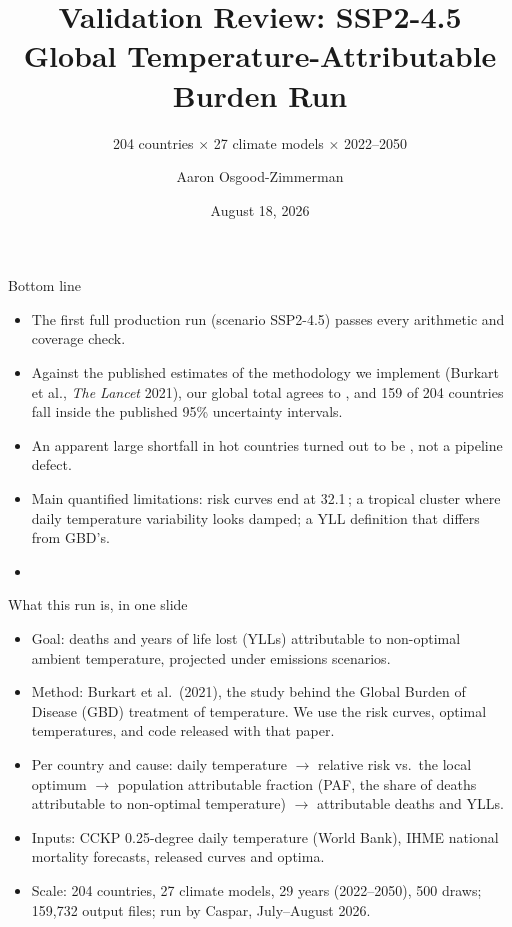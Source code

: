 \documentclass[aspectratio=169,11pt]{beamer}
\title{Validation Review: SSP2-4.5 Global Temperature-Attributable Burden Run}
\subtitle{204 countries \(\times\) 27 climate models \(\times\) 2022--2050}
\author{Aaron Osgood-Zimmerman}
\institute{OZ Labs LLC, for the World Bank climate-health project}
\date{August 18, 2026}
\begin{document}
\begin{frame}
  \titlepage
\end{frame}

\begin{frame}{Bottom line}
  \begin{itemize}
    \item The first full production run (scenario SSP2-4.5) passes every
      arithmetic and coverage check.
    \item Against the published estimates of the methodology we implement
      (Burkart et al., \textit{The Lancet} 2021), our global total agrees to
      , and 159 of 204 countries fall inside the published
      95\% uncertainty intervals.
    \item An apparent large shortfall in hot countries turned out to be
      , not a pipeline
      defect.
    \item Main quantified limitations: risk curves end at
      32.1\,\textcelsius{}; a tropical cluster where daily temperature
      variability looks damped; a YLL definition that differs from GBD's.
    \item {}
  \end{itemize}
\end{frame}

\begin{frame}{What this run is, in one slide}
  \begin{itemize}
    \item Goal: deaths and years of life lost (YLLs) attributable to
      non-optimal ambient temperature, projected under emissions scenarios.
    \item Method: Burkart et al.\ (2021), the study behind the Global Burden
      of Disease (GBD) treatment of temperature. We use the risk curves,
      optimal temperatures, and code released with that paper.
    \item Per country and cause: daily temperature \(\rightarrow\) relative
      risk vs.\ the local optimum \(\rightarrow\) population attributable
      fraction (PAF, the share of deaths attributable to non-optimal
      temperature) \(\rightarrow\) attributable deaths and YLLs.
    \item Inputs: CCKP 0.25-degree daily temperature (World Bank), IHME
      national mortality forecasts, released curves and optima.
    \item Scale: 204 countries, 27 climate models, 29 years (2022--2050),
      500 draws; 159{,}732 output files; run by Caspar, July--August 2026.
  \end{itemize}
\end{frame}
\end{document}
